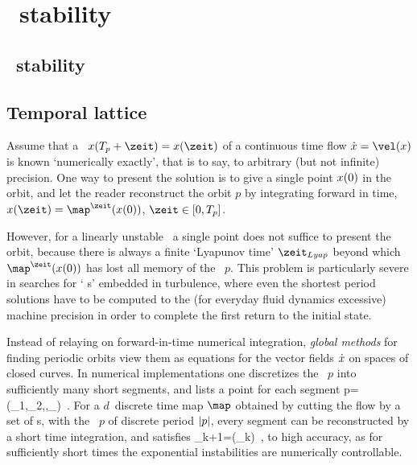 
\ifblog
\chapter{\Spt\ stability}
\label{chap:stability}
\else %
\section{\Spt\ stability}
\label{s:stability}
\fi

\renewcommand{\deltaX}{\ensuremath{{\Delta \ssp}}}       %

\section{Temporal lattice}
\label{s:TempLatt}
%
Assume that a \po\ $\ssp(\period{p}+\zeit)=\ssp(\zeit)$ of a continuous
time flow
\(
\dot{\ssp}=\vel(\ssp)
\)
is known `numerically exactly', that is to say, to arbitrary (but not
infinite) precision. One way to present the solution is to give a single
point $x(0)$ in the orbit, and let the reader reconstruct the orbit
$p$ by integrating forward in time,
$\ssp(\zeit)=\map^\zeit(\ssp(0))$, $\zeit\in[0,\period{p}]$.

However, for a linearly unstable \po\ a single point does not suffice to
present the orbit, because there is always a finite `Lyapunov time'
$\zeit_{Lyap}$  beyond which $\map^\zeit(\ssp(0))$ has lost all memory of
the \po\ $p$. This problem is particularly severe in searches for {`\ecs
s'} embedded in turbulence, where even the shortest period solutions have
to be computed to the (for everyday fluid dynamics excessive) machine
precision in order to complete the
first return to the initial state.

Instead of relaying on forward-in-time numerical integration,
\emph{global methods} for finding periodic orbits view them
as equations for the vector fields $\dot{x}$ on spaces of closed
curves. In numerical implementations one discretizes the \po\  $p$ into
sufficiently many short
segments, and lists a
point for each segment
\beq
p=(\ssp_1,\ssp_2,\cdots,\ssp_)
\,.
For a $d$\dmn\ discrete time map $\map$ obtained by cutting the flow by a
set of {\PoincSec s}, with the \po\ $p$ of discrete period ${|p|}$,
every segment can be reconstructed by a short time integration, and
satisfies
\beq
\ssp_{k+1}=\map(\ssp_k)
\,,
to high accuracy, as for sufficiently short times the exponential
instabilities are numerically controllable.

